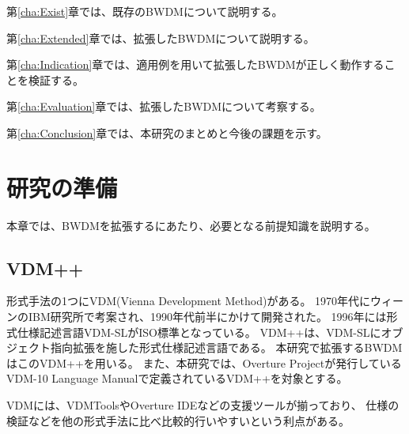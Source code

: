 \documentclass[uplatex, report, a4j, 10pt]{jsbook}
\newcommand{\tool}{BWDM}
\begin{document}
第\ref{cha:Exist}章では、既存の\tool{}について説明する。

第\ref{cha:Extended}章では、拡張した\tool{}について説明する。

第\ref{cha:Indication}章では、適用例を用いて拡張した\tool{}が正しく動作することを検証する。

第\ref{cha:Evaluation}章では、拡張した\tool{}について考察する。

第\ref{cha:Conclusion}章では、本研究のまとめと今後の課題を示す。



\chapter{研究の準備}\label{cha:Preparation}

本章では、\tool{}を拡張するにあたり、必要となる前提知識を説明する。

\section{VDM++}
形式手法の1つにVDM(Vienna Development Method)\cite{vdm}がある。
1970年代にウィーンのIBM研究所で考案され、1990年代前半にかけて開発された。
1996年には形式仕様記述言語VDM-SLがISO標準となっている\cite{iso96}。
VDM++は、VDM-SLにオブジェクト指向拡張を施した形式仕様記述言語である。
本研究で拡張するBWDMはこのVDM++を用いる。
また、本研究では、Overture Projectが発行しているVDM-10 Language Manualで定義されているVDM++を対象とする\cite{vdm_manual}。

VDMには、VDMTools\cite{vdmtools}やOverture IDE\cite{overture}などの支援ツールが揃っており、
仕様の検証などを他の形式手法に比べ比較的行いやすいという利点がある。
\end{document}
